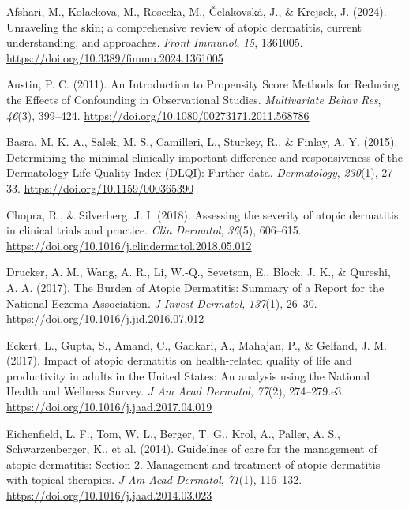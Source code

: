 \documentclass[
]{agujournal2019}
\newlength{\cslhangindent}
\newenvironment{CSLReferences}[2] %
 {\begin{list}{}{%
  \setlength{\itemindent}{0pt}
  \setlength{\leftmargin}{0pt}
  \setlength{\parsep}{0pt}
  \ifodd #1
   \setlength{\leftmargin}{\cslhangindent}
   \setlength{\itemindent}{-1\cslhangindent}
  \fi
  \setlength{\itemsep}{#2\baselineskip}}}
 {\end{list}}
\begin{document}
\protect{}\label{refs}
\begin{CSLReferences}{1}{0}
\vspace{1em}

Afshari, M., Kolackova, M., Rosecka, M., Čelakovská, J., \& Krejsek, J.
(2024). Unraveling the skin; a comprehensive review of atopic
dermatitis, current understanding, and approaches. \emph{Front Immunol},
\emph{15}, 1361005. \url{https://doi.org/10.3389/fimmu.2024.1361005}

Austin, P. C. (2011). An {Introduction} to {Propensity} {Score}
{Methods} for {Reducing} the {Effects} of {Confounding} in
{Observational} {Studies}. \emph{Multivariate Behav Res}, \emph{46}(3),
399--424. \url{https://doi.org/10.1080/00273171.2011.568786}

Basra, M. K. A., Salek, M. S., Camilleri, L., Sturkey, R., \& Finlay, A.
Y. (2015). Determining the minimal clinically important difference and
responsiveness of the {Dermatology} {Life} {Quality} {Index} ({DLQI}):
Further data. \emph{Dermatology}, \emph{230}(1), 27--33.
\url{https://doi.org/10.1159/000365390}

Chopra, R., \& Silverberg, J. I. (2018). Assessing the severity of
atopic dermatitis in clinical trials and practice. \emph{Clin Dermatol},
\emph{36}(5), 606--615.
\url{https://doi.org/10.1016/j.clindermatol.2018.05.012}

Drucker, A. M., Wang, A. R., Li, W.-Q., Sevetson, E., Block, J. K., \&
Qureshi, A. A. (2017). The {Burden} of {Atopic} {Dermatitis}: {Summary}
of a {Report} for the {National} {Eczema} {Association}. \emph{J Invest
Dermatol}, \emph{137}(1), 26--30.
\url{https://doi.org/10.1016/j.jid.2016.07.012}

Eckert, L., Gupta, S., Amand, C., Gadkari, A., Mahajan, P., \& Gelfand,
J. M. (2017). Impact of atopic dermatitis on health-related quality of
life and productivity in adults in the {United} {States}: {An} analysis
using the {National} {Health} and {Wellness} {Survey}. \emph{J Am Acad
Dermatol}, \emph{77}(2), 274--279.e3.
\url{https://doi.org/10.1016/j.jaad.2017.04.019}

Eichenfield, L. F., Tom, W. L., Berger, T. G., Krol, A., Paller, A. S.,
Schwarzenberger, K., et al. (2014). Guidelines of care for the
management of atopic dermatitis: Section 2. {Management} and treatment
of atopic dermatitis with topical therapies. \emph{J Am Acad Dermatol},
\emph{71}(1), 116--132. \url{https://doi.org/10.1016/j.jaad.2014.03.023}


\end{CSLReferences}
\end{document}
